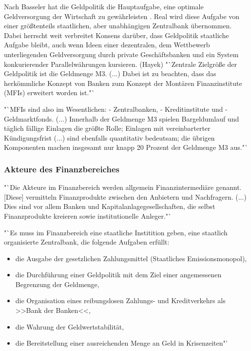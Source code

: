Nach Basseler hat die Geldpolitik die Hauptaufgabe, eine optimale Geldversorgung der Wirtschaft zu gewährleisten \citep*[vgl.][S. 551]{Basseler2010}.
Real wird diese Aufgabe von einer größtenteils staatlichen, aber unabhängigen Zentralbank übernommen. Dabei herrscht weit verbreitet Konsens darüber, dass Geldpolitik staatliche Aufgabe bleibt, auch wenn Ideen einer dezentralen, dem Wettbewerb unterliegenden Geldversorgung durch private Geschäftsbanken und ein System konkurierender Parallelwährungen kursieren. (Hayek)
"`Zentrale Zielgröße der Geldpolitik ist die Geldmenge M3. (...) Dabei ist zu beachten, dass das herkömmliche Konzept von Banken zum Konzept der Montären Finanzinstitute (MFIs) erweitert worden ist."`
\citep*[vgl.][S. 507]{Basseler2010}

\citep*[vgl.][S.508]{Basseler2010} "`MFIs sind also im Wesentlichen:
- Zentralbanken,
- Kreditinstitute und
- Geldmarktfonds.
(...) Innerhalb der Geldmenge M3 spielen Bargeldumlauf und täglich fällige Einlagen die größte Rolle; Einlagen mit vereinbarterter Kündigungsfrist (...) sind ebenfalls quantitativ bedeutsam; die übrigen Komponenten machen insgesamt nur knapp 20 Prozent der Geldmenge M3 aus."`


\subsubsection{ Akteure des Finanzbereiches}
\citep*[vgl.][S.511f]{Basseler2010} "`Die Akteure im Finanzbereich werden allgemein Finanzintermediäre genannt. [Diese] vermitteln Finanzprodukte zwischen den Anbietern und Nachfragern. (...) Dies sind vor allem Banken und Kapitalanlagegesellschaften, die selbst Finanzprodukte kreieren sowie institutionelle Anleger."`

 "`Es muss im Finanzbereich eine staatliche Institition geben, eine staatlich organisierte Zentralbank, die folgende Aufgaben erfüllt:
 \begin{itemize}
\item{die Ausgabe der gesetzlichen Zahlungsmittel (Staatliches Emissionsmonopol),}
\item{die Durchführung einer Geldpolitik mit dem Ziel einer angemessenen Begrenzung der Geldmenge,}
\item{die Organisation eines reibungslosen Zahlungs- und Kreditverkehrs als >>Bank der Banken<<,}
\item{die Wahrung der Geldwertstabilität,}
\item{die Bereitstellung einer ausreichenden Menge an Geld in Krisenzeiten"'}
\end{itemize}


